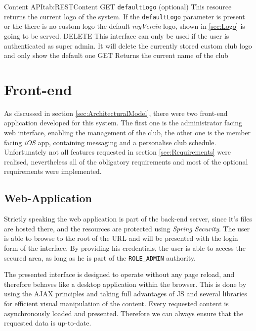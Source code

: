 \begin{RESTTable}{Content API}{tab:RESTContent}
		{GET}
		{\texttt{defaultLogo} (optional)}
		{This resource returns the current logo of the system. If the \texttt{defaultLogo} parameter is present or the there is no custom logo the default \emph{myVerein} logo, shown in \vref{sec:Logo} is going to be served.}
		{DELETE}
		{}
		{This interface can only be used if the user is authenticated as super admin. It will delete the currently stored custom club logo and only show the default one}
		{GET}
		{}
		{Returns the current name of the club}
\end{RESTTable}

\section{Front-end}
\label{sec:FrontEnd}

As discussed in section \vref{sec:ArchitecturalModel}, there were two front-end application developed for this system. The first one is the administrator facing web interface, enabling the management of the club, the other one is the member facing \emph{iOS} app, containing messaging and a personalise club schedule. Unfortunately not all features requested in section \vref{sec:Requirements} were realised, nevertheless all of the obligatory requirements and most of the optional requirements were implemented.

\subsection{Web-Application}

Strictly speaking the web application is part of the back-end server, since it's files are hosted there, and the resources are protected using \emph{Spring Security}. The user is able to browse to the root of the \gls{URL} and will be presented with the login form of the interface. By providing his credentials, the user is able to access the secured area, as long as he is part of the \texttt{ROLE\_ADMIN} authority.

The presented interface is designed to operate without any page reload, and therefore behaves like a desktop application within the browser. This is done by using the \gls{AJAX} principles and taking full advantages of \gls{JS} and several libraries for efficient visual manipulation of the content. Every requested content is asynchronously loaded and presented. Therefore we can always ensure that the requested data is up-to-date.


